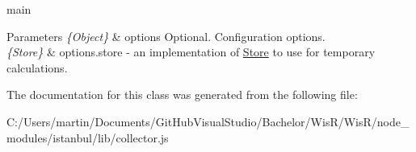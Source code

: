 main  
\begin{DoxyParams}{Parameters}
{\em \{\+Object\}} & options Optional. Configuration options. \\
\hline
{\em \{\+Store\}} & options.\+store -\/ an implementation of {\ttfamily \hyperlink{class_store}{Store}} to use for temporary calculations. \\
\hline
\end{DoxyParams}


The documentation for this class was generated from the following file\+:\begin{DoxyCompactItemize}
\item 
C\+:/\+Users/martin/\+Documents/\+Git\+Hub\+Visual\+Studio/\+Bachelor/\+Wis\+R/\+Wis\+R/node\+\_\+modules/istanbul/lib/collector.\+js\end{DoxyCompactItemize}
